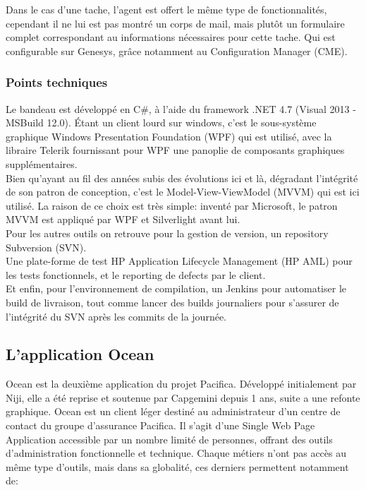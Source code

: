 \documentclass{rapport}
\begin{document}
Dans le cas d'une tache, l'agent est offert le même type de fonctionnalités, cependant il ne lui est pas montré un corps de mail, mais plutôt un formulaire complet correspondant au informations nécessaires pour cette tache. Qui est configurable sur Genesys, grâce notamment au Configuration Manager (CME).

\subsubsection{Points techniques}

Le bandeau est développé en C\#, à l'aide du framework .NET 4.7 (Visual 2013 - MSBuild 12.0).
Étant un client lourd sur windows, c'est le sous-système graphique Windows Presentation Foundation (WPF) qui est utilisé, avec la libraire Telerik fournissant pour WPF une panoplie de composants graphiques supplémentaires.\\

Bien qu'ayant au fil des années subis des évolutions ici et là, dégradant l'intégrité de son patron de conception, c'est le Model-View-ViewModel (MVVM) qui est ici utilisé. La raison de ce choix est très simple: inventé par Microsoft, le patron MVVM est appliqué par WPF et Silverlight avant lui.\\

Pour les autres outils on retrouve pour la gestion de version, un repository Subversion (SVN).\\
Une plate-forme de test HP Application Lifecycle Management (HP AML) pour les tests fonctionnels, et le reporting de defects par le client.\\
Et enfin, pour l'environnement de compilation, un Jenkins pour automatiser le build de livraison, tout comme lancer des builds journaliers pour s'assurer de l'intégrité du SVN après les commits de la journée.

\subsection{L'application Ocean}

Ocean est la deuxième application du projet Pacifica. Développé initialement par Niji, elle a été reprise et soutenue par Capgemini depuis 1 ans, suite a une refonte graphique. Ocean est un client léger destiné au administrateur d'un centre de contact du groupe d'assurance Pacifica. Il s'agit d'une Single Web Page Application accessible par un nombre limité de personnes, offrant des outils d'administration fonctionnelle et technique. Chaque métiers n'ont pas accès au même type d'outils, mais dans sa globalité, ces derniers permettent notamment de:\\
\end{document}
